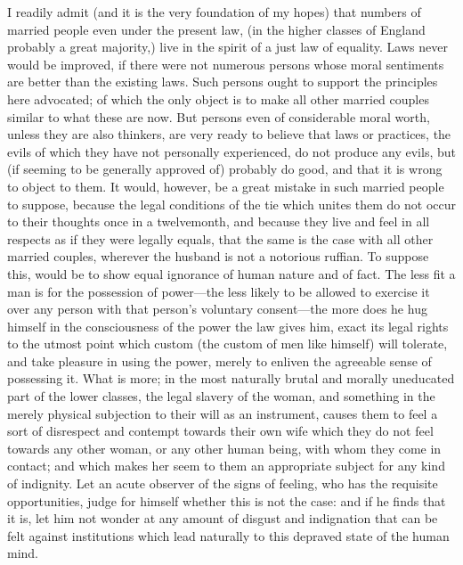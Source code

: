 \documentclass[12pt]{report}
\begin{document}
I readily admit (and it is the very foundation of my hopes) that numbers of married people even under the present law, (in the higher classes of England probably a great majority,) live in the spirit of a just law of equality. Laws never would be improved, if there were not numerous persons whose moral sentiments are better than the existing laws. Such persons ought to support the principles here advocated; of which the only object is to make all other married couples similar to what these are now. But persons even of considerable moral worth, unless they are also thinkers, are very ready to believe that laws or practices, the evils of which they have not personally experienced, do not produce any evils, but (if seeming to be generally approved of) probably do good, and that it is wrong to object to them. It would, however, be a great mistake in such married people to suppose, because the legal conditions of the tie which unites them do not occur to their thoughts once in a twelvemonth, and because they live and feel in all respects as if they were legally equals, that the same is the case with all other married couples, wherever the husband is not a notorious ruffian. To suppose this, would be to show equal ignorance of human nature and of fact. The less fit a man is for the possession of power—the less likely to be allowed to exercise it over any person with that person's voluntary consent—the more does he hug himself in the consciousness of the power the law gives him, exact its legal rights to the utmost point which custom (the custom of men like himself) will tolerate, and take pleasure in using the power, merely to enliven the agreeable sense of possessing it. What is more; in the most naturally brutal and morally uneducated part of the lower classes, the legal slavery of the woman, and something in the merely physical subjection to their will as an instrument, causes them to feel a sort of disrespect and contempt towards their own wife which they do not feel towards any other woman, or any other human being, with whom they come in contact; and which makes her seem to them an appropriate subject for any kind of indignity. Let an acute observer of the signs of feeling, who has the requisite opportunities, judge for himself whether this is not the case: and if he finds that it is, let him not wonder at any amount of disgust and indignation that can be felt against institutions which lead naturally to this depraved state of the human mind.
\end{document}
